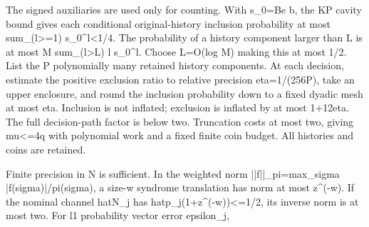 \documentclass[
]{article}
\begin{document}
The signed auxiliaries are used only for counting. With s\_0=Be b, the
KP cavity bound gives each conditional original-history inclusion
probability at most sum\_(l\textgreater=1) s\_0\^{}l\textless1/4. The
probability of a history component larger than L is at most M
sum\_(l\textgreater L) l s\_0\^{}l. Choose L=O(log M) making this at
most 1/2. List the P polynomially many retained history components. At
each decision, estimate the positive exclusion ratio to relative
precision eta=1/(256P), take an upper enclosure, and round the inclusion
probability down to a fixed dyadic mesh at most eta. Inclusion is not
inflated; exclusion is inflated by at most 1+12eta. The full
decision-path factor is below two. Truncation costs at most two, giving
mu\textless=4q with polynomial work and a fixed finite coin budget. All
histories and coins are retained.

Finite precision in N is sufficient. In the weighted norm
|\allowbreak{}|\allowbreak{}f\allowbreak{}|\allowbreak{}|\allowbreak{}\_\allowbreak{}p\allowbreak{}i\allowbreak{}=\allowbreak{}m\allowbreak{}a\allowbreak{}x\allowbreak{}\_\allowbreak{}s\allowbreak{}i\allowbreak{}g\allowbreak{}m\allowbreak{}a
|\allowbreak{}f\allowbreak{}(\allowbreak{}s\allowbreak{}i\allowbreak{}g\allowbreak{}m\allowbreak{}a\allowbreak{})\allowbreak{}|\allowbreak{}/\allowbreak{}p\allowbreak{}i\allowbreak{}(\allowbreak{}s\allowbreak{}i\allowbreak{}g\allowbreak{}m\allowbreak{}a\allowbreak{})\allowbreak{},
a size-w syndrome translation has norm at most z\^{}(-w). If the nominal
channel hatN\_j has
h\allowbreak{}a\allowbreak{}t\allowbreak{}p\allowbreak{}\_\allowbreak{}j\allowbreak{}(\allowbreak{}1\allowbreak{}+\allowbreak{}z\allowbreak{}\^{}\allowbreak{}(\allowbreak{}-\allowbreak{}w\allowbreak{})\allowbreak{})\allowbreak{}<\allowbreak{}=\allowbreak{}1\allowbreak{}/\allowbreak{}2\allowbreak{},
its inverse norm is at most two. For l1 probability vector error
epsilon\_j,
\end{document}
